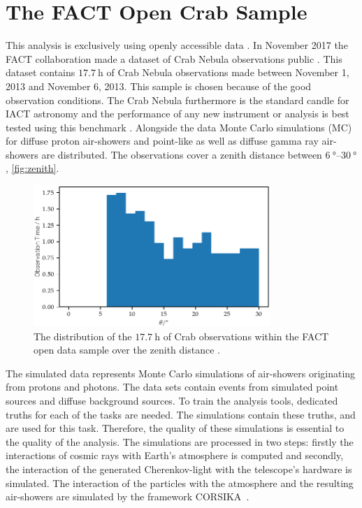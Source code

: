 \chapter{The FACT Open Crab Sample}
%
This analysis is exclusively using openly accessible data \cite{fact-data}. In November 2017 the
FACT collaboration made a dataset of Crab Nebula observations public
\cite{FACT-Design, FACT-Calib}. This dataset contains $\SI{17.7}{\hour}$
of Crab Nebula observations made between November 1, 2013 and November 6, 2013.
This sample is chosen because of the good observation conditions. The Crab Nebula furthermore is the standard candle for IACT astronomy and the performance of any new instrument or analysis is best tested using this benchmark \cite{holder}. Alongside the
data Monte Carlo simulations (MC) for diffuse proton air-showers and point-like
as well as diffuse gamma ray air-showers are distributed. The observations
cover a zenith distance between $\SIrange{6}{30}{\degree}$, \autoref{fig:zenith}.
%
\begin{figure}
  \centering%
  \includegraphics[width=0.8\textwidth]{Plots/zenith.pdf}%
  \caption{The distribution of the $\SI{17.7}{\hour}$ of Crab observations within the FACT open data sample over the zenith distance \cite{fact-data}.}%
  \label{fig:zenith}%
\end{figure}
%
The simulated data represents Monte Carlo simulations of air-showers
originating from protons and photons. The data sets contain events from
simulated point sources and diffuse background sources. To train the analysis
tools, dedicated truths for each of the tasks are needed. The simulations
contain these truths, and are used for this task. Therefore, the quality of
these simulations is essential to the quality of the analysis. The simulations
are processed in two steps: firstly the interactions of cosmic rays with Earth's
atmosphere is computed and secondly, the interaction of the generated Cherenkov-light with the telescope's hardware is simulated. The interaction of the particles with the atmosphere and the resulting air-showers are simulated by the framework CORSIKA~\cite{CORSIKA}.

